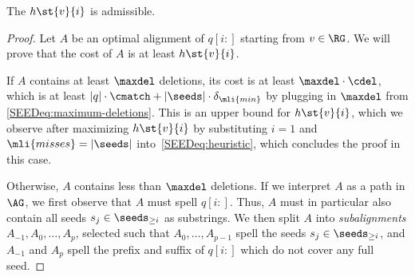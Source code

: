 \begin{thm}[Admissibility]
	\label{SEEDthe:admissible}
	The \seedh $h\st{v}{i}$ is admissible.
\end{thm}
\begin{proof}
	Let $A$ be an optimal alignment of $q[i{:}]$ starting from $v \in \RG$. We
	will prove that the cost of $A$ is at least $h\st{v}{i}$.

	If $A$ contains at least $\maxdel$ deletions, its cost is at least $\maxdel
	\cdot \cdel$, which is at least $|q| \cdot \cmatch + |\seeds| \cdot
	\delta_{\mli{min}}$ by plugging in $\maxdel$ from
	\cref{SEEDeq:maximum-deletions}. This is an upper bound for $h\st{v}{i}$, which
	we observe after maximizing $h\st{v}{i}$ by substituting $i=1$ and
	$\mli{misses}=|\seeds|$ into~\cref{SEEDeq:heuristic}, which concludes the proof
	in this case.

	Otherwise, $A$ contains less than $\maxdel$ deletions.
	If we interpret $A$ as a path in $\AG$, we first observe that $A$ must spell
	$q[i{:}]$. Thus, $A$ must in particular also contain all seeds $s_j \in
	\seeds_{\geq i}$ as substrings. We then split $A$ into \emph{subalignments}
	$A_{-1}, A_0, \dots, A_{p}$, selected such that $A_0, \dots, A_{p-1}$ spell
	the seeds $s_j \in \seeds_{\geq i}$, and $A_{-1}$ and $A_p$ spell the prefix
	and suffix of $q[i{:}]$ which do not cover any full seed.


\end{proof}
